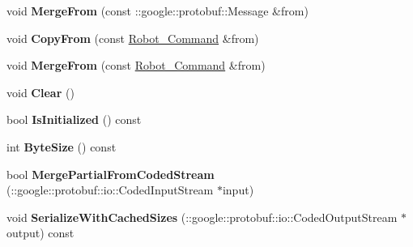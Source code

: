\begin{DoxyCompactItemize}
\item 
void {\bfseries Merge\+From} (const \+::google\+::protobuf\+::\+Message \&from)\hypertarget{classvss__command_1_1Robot__Command_a72b9a2f6e5fcb0ee33f5c1a5782bb655}{}\label{classvss__command_1_1Robot__Command_a72b9a2f6e5fcb0ee33f5c1a5782bb655}

\item 
void {\bfseries Copy\+From} (const \hyperlink{classvss__command_1_1Robot__Command}{Robot\+\_\+\+Command} \&from)\hypertarget{classvss__command_1_1Robot__Command_a98f8965b27b6495b2d59dccd8d2bfe19}{}\label{classvss__command_1_1Robot__Command_a98f8965b27b6495b2d59dccd8d2bfe19}

\item 
void {\bfseries Merge\+From} (const \hyperlink{classvss__command_1_1Robot__Command}{Robot\+\_\+\+Command} \&from)\hypertarget{classvss__command_1_1Robot__Command_a48c5d39a8a3d31209db79aa77fcf876f}{}\label{classvss__command_1_1Robot__Command_a48c5d39a8a3d31209db79aa77fcf876f}

\item 
void {\bfseries Clear} ()\hypertarget{classvss__command_1_1Robot__Command_aaffa12def3a1311252dcaccf6becb28b}{}\label{classvss__command_1_1Robot__Command_aaffa12def3a1311252dcaccf6becb28b}

\item 
bool {\bfseries Is\+Initialized} () const \hypertarget{classvss__command_1_1Robot__Command_af368ddcdb8103f40b21503727664fc52}{}\label{classvss__command_1_1Robot__Command_af368ddcdb8103f40b21503727664fc52}

\item 
int {\bfseries Byte\+Size} () const \hypertarget{classvss__command_1_1Robot__Command_a54599973bda6814c7842036eb9bf9229}{}\label{classvss__command_1_1Robot__Command_a54599973bda6814c7842036eb9bf9229}

\item 
bool {\bfseries Merge\+Partial\+From\+Coded\+Stream} (\+::google\+::protobuf\+::io\+::\+Coded\+Input\+Stream $\ast$input)\hypertarget{classvss__command_1_1Robot__Command_a471b2b99a1e476866bdb6ded82d46274}{}\label{classvss__command_1_1Robot__Command_a471b2b99a1e476866bdb6ded82d46274}

\item 
void {\bfseries Serialize\+With\+Cached\+Sizes} (\+::google\+::protobuf\+::io\+::\+Coded\+Output\+Stream $\ast$output) const \hypertarget{classvss__command_1_1Robot__Command_add920699d3f456d9335a4fbacf4a1fa5}{}\label{classvss__command_1_1Robot__Command_add920699d3f456d9335a4fbacf4a1fa5}


\end{DoxyCompactItemize}

